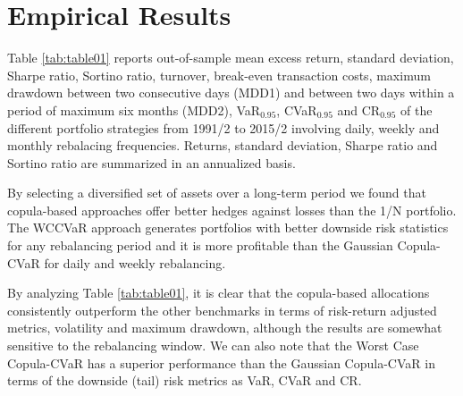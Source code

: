 \documentclass[a4paper,10pt]{article}
\begin{document}




\section{Empirical Results}

Table \ref{tab:table01} reports out-of-sample mean excess return, standard deviation, Sharpe ratio, Sortino ratio, turnover, break-even transaction costs, maximum drawdown between two consecutive days (MDD1) and between two days within a period of maximum six months (MDD2), VaR$_{0.95}$, CVaR$_{0.95}$ and CR$_{0.95}$ of the different portfolio strategies from 1991/2 to 2015/2 involving daily, weekly and monthly rebalacing frequencies. Returns, standard deviation, Sharpe ratio and Sortino ratio are summarized in an annualized basis.

By selecting a diversified set of assets over a long-term period we found that copula-based approaches offer better hedges against losses than the 1/N portfolio. The WCCVaR approach generates portfolios with better downside risk statistics for any rebalancing period and it is more profitable than the Gaussian Copula-CVaR for daily and weekly rebalancing.

By analyzing Table \ref{tab:table01}, it is clear that the copula-based allocations consistently outperform the other benchmarks in terms of risk-return adjusted metrics, volatility and maximum drawdown, although the results are somewhat sensitive to the rebalancing window. We can also note that the Worst Case Copula-CVaR has a superior performance than the Gaussian Copula-CVaR in terms of the downside (tail) risk metrics as VaR, CVaR and CR. 
\end{document}
